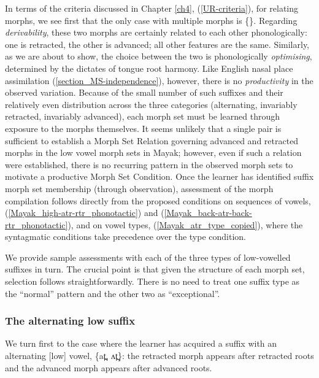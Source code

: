 In terms of the criteria discussed in Chapter \ref{ch4},  (\ref{UR-criteria}), for relating morphs, we see first that the only case with multiple morphs is \{\}. Regarding {\it derivability}, these two morphs are certainly related to each other phonologically: one is retracted, the other is advanced; all other features are the same. Similarly, as we are about to show, the choice between the two is phonologically {\it optimising}, determined by the dictates of tongue root harmony. Like English nasal place assimilation (\textsection\ref{section_MS-independence}), however, there is no {\it productivity} in the observed variation. Because of the small number of such suffixes and their relatively even distribution across the three categories (alternating, invariably retracted, invariably advanced), each morph set must be learned through exposure to the morphs themselves. {It seems unlikely that a single pair is sufficient to establish a Morph Set Relation governing advanced and retracted morphs in the low vowel morph sets in Mayak; however, even if such a relation were established, there is no recurring pattern in the observed morph sets to motivate a productive Morph Set Condition.} Once the learner has identified suffix morph set membership (through observation), assessment of the morph compilation follows directly from the proposed conditions on sequences of vowels, (\ref{Mayak_high-atr-rtr_phonotactic}) and (\ref{Mayak_back-atr-back-rtr_phonotactic}), and  on vowel types, (\ref{Mayak_atr_type_copied}), where the syntagmatic conditions take precedence over the type condition.


We provide sample assessments with each of the three types of low-vowelled suffixes in turn. The crucial point is that given the structure of each morph set, selection follows straightforwardly. There is no need to treat one suffix type as the ``normal'' pattern and the other two as ``exceptional''.

\subsubsection{The alternating low suffix}
We turn first to the case where the learner has acquired a  suffix with an alternating [low] vowel, \{a​t̪, ʌ​t̪\}: the retracted morph appears after retracted roots and the advanced morph appears after advanced roots.


